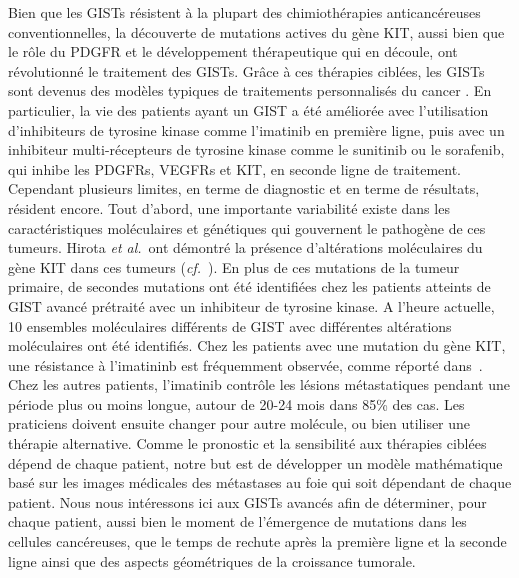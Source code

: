\documentclass[11pt]{amsart}
\numberwithin{equation}{section}
\newcommand{\etal}{{\it et al.}}
\newcommand{\cf}{\textit{cf.}~}
\begin{document}
Bien que les GISTs résistent à la plupart des chimiothérapies anticancéreuses conventionnelles, 
la découverte de mutations actives du gène KIT, aussi bien que le rôle du PDGFR et le développement thérapeutique qui en découle, ont révolutionné le traitement des GISTs.
Grâce à ces thérapies ciblées, les GISTs sont devenus des modèles typiques de traitements personnalisés du cancer \cite{Blay2012}. 
En particulier, la vie des patients ayant un GIST a été améliorée avec l'utilisation d'inhibiteurs de tyrosine kinase comme l'imatinib en première ligne, puis avec un inhibiteur multi-récepteurs de tyrosine kinase comme
le sunitinib ou le sorafenib,  
qui inhibe les PDGFRs, VEGFRs et KIT, en seconde ligne de traitement. 
Cependant plusieurs limites, en terme de diagnostic et en terme de résultats, résident encore.
Tout d'abord, une importante variabilité existe dans les caractéristiques moléculaires et génétiques qui gouvernent le pathogène de ces tumeurs.
Hirota \etal\ ont démontré la présence d'altérations moléculaires du gène KIT dans ces tumeurs (\cf \cite{Hirota1998}). 
En plus de ces mutations de la tumeur primaire, de secondes mutations ont été identifiées chez les patients atteints de GIST avancé prétraité avec un inhibiteur de tyrosine kinase. A l'heure actuelle, 10 ensembles moléculaires différents de GIST avec différentes altérations moléculaires ont été identifiés. 
Chez les patients avec une mutation du gène KIT, une résistance à l'imatininb est fréquemment observée, comme réporté dans~\cite{Blay2011}. 
Chez les autres patients, l'imatinib contrôle les lésions métastatiques pendant une période plus ou moins longue, autour de 
20-24 mois dans 85\% des cas. 
Les praticiens doivent ensuite changer pour autre molécule, ou bien utiliser une thérapie alternative. Comme le pronostic et la sensibilité aux thérapies ciblées dépend de chaque patient, notre but est de développer un modèle mathématique basé sur les images médicales des métastases au foie qui soit dépendant de chaque patient.
Nous nous intéressons ici aux GISTs avancés afin de déterminer, pour chaque patient, aussi bien le moment de l'émergence de mutations dans les cellules cancéreuses, que le temps de rechute après la première ligne et la seconde ligne ainsi que des aspects géométriques de la croissance tumorale.
\end{document}
